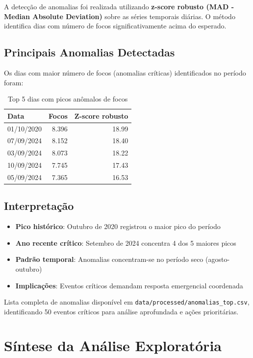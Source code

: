 \documentclass[12pt,a4paper]{report}
\begin{document}
A detecção de anomalias foi realizada utilizando \textbf{z-score robusto (MAD - Median Absolute Deviation)} sobre as séries temporais diárias. O método identifica dias com número de focos significativamente acima do esperado.

\subsection{Principais Anomalias Detectadas}

Os dias com maior número de focos (anomalias críticas) identificados no período foram:

\begin{table}[h]
\centering
\caption{Top 5 dias com picos anômalos de focos}
\label{tab:anomalias}
\begin{tabular}{lrr}
\toprule
\textbf{Data} & \textbf{Focos} & \textbf{Z-score robusto} \\
\midrule
01/10/2020 & 8.396 & 18.99 \\
07/09/2024 & 8.152 & 18.40 \\
03/09/2024 & 8.073 & 18.22 \\
10/09/2024 & 7.745 & 17.43 \\
05/09/2024 & 7.365 & 16.53 \\
\bottomrule
\end{tabular}
\end{table}

\subsection{Interpretação}

\begin{itemize}
  \item \textbf{Pico histórico}: Outubro de 2020 registrou o maior pico do período
  \item \textbf{Ano recente crítico}: Setembro de 2024 concentra 4 dos 5 maiores picos
  \item \textbf{Padrão temporal}: Anomalias concentram-se no período seco (agosto-outubro)
  \item \textbf{Implicações}: Eventos críticos demandam resposta emergencial coordenada
\end{itemize}

\noindent Lista completa de anomalias disponível em \texttt{data/processed/anomalias\_top.csv}, identificando 50 eventos críticos para análise aprofundada e ações prioritárias.

\section{Síntese da Análise Exploratória}
\end{document}
